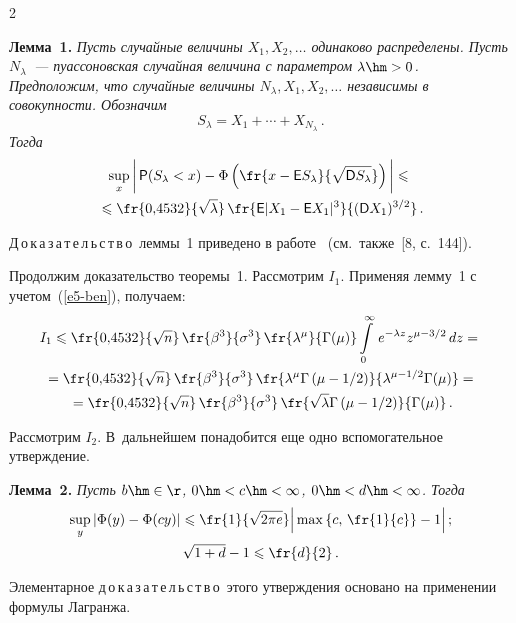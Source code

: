 \begin{multicols}{2}
\smallskip

\noindent
\textbf{Лемма~1.} \textit{Пусть случайные величины $X_1,X_2,\ldots$
одинаково распределены. Пусть $N_{\lambda}$~--- пуассоновская
случайная величина с параметром $\lambda\hm>0$. Предположим, что
случайные величины $N_{\lambda},X_1,X_2,\ldots$ независимы в
совокупности. Обозначим
$$
S_{\lambda}=X_1+\cdots+X_{N_{\lambda}}\,.
$$
Тогда}
\begin{multline*}
\sup\limits_x\bigg|\,{\sf P}(S_{\lambda}<x)-\Phi\left(\fr{x-{\sf
E}S_{\lambda}}{\sqrt{{\sf D}S_{\lambda}}}\right)\bigg|
\leqslant{}\\
{}\leqslant
\fr{0{,}4532}{\sqrt{\lambda}}\,
\fr{{\sf E}|X_1-{\sf E}X_1|^3}{({\sf D}X_1)^{3/2}}\,.
\end{multline*}

\smallskip

\noindent
Д\,о\,к\,а\,з\,а\,т\,е\,л\,ь\,с\,т\,в\,о\ леммы~1 приведено в 
работе~\cite{KorolevShevtsovaShorgin2011}
(см.\ также~[8, с.~144]).

\smallskip

Продолжим доказательство теоремы~1. Рас\-смот\-рим $I_1$. Применяя лемму~1 с учетом~(\ref{e5-ben}),
получаем:
\begin{multline}
I_1\leqslant\fr{0{,}4532}{\sqrt{n}}\,
\fr{\beta^3}{\sigma^3}\,
\fr{\lambda^{\mu}}{\Gamma(\mu)}\int\limits_{0}^{\infty}\,
e^{-\lambda z}z^{\mu-3/2}\,dz={}\\
{}=
\fr{0{,}4532}{\sqrt{n}}\,
\fr{\beta^3}{\sigma^3}\,
\fr{\lambda^{\mu}\Gamma\left(\mu-{1}/{2}\right)}{\lambda^{\mu-1/2}\Gamma(\mu)}={}\\
{}=
\fr{0{,}4532}{\sqrt{n}}\,\fr{\beta^3}{\sigma^3}\,
\fr{\sqrt{\lambda}\Gamma\left(\mu-{1}/{2}\right)}{\Gamma(\mu)}\,.
\label{e7-ben}
\end{multline}

Рассмотрим $I_2$. В~дальнейшем понадобится еще одно вспомогательное
утверждение.

\smallskip

\noindent
\textbf{Лемма~2.} \textit{Пусть $b\hm\in\r$, $0\hm<c\hm<\infty$, $0\hm<d\hm<\infty$.
Тогда}
\begin{gather}
\sup\limits_y|\Phi(y)-\Phi(cy)|\leqslant\fr{1}{\sqrt{2\pi e}}
\Big|\max\left\{c,\,\fr{1}{c}\right\}-1\Big|\,;\label{e8-ben}
\\
\sqrt{1+d}-1\leqslant\fr{d}{2}\,.\label{e9-ben}
\end{gather}

\smallskip

\noindent
Элементарное д\,о\,к\,а\,з\,а\,т\,е\,л\,ь\,с\,т\,в\,о\ этого утверждения основано
на применении формулы Лагранжа.


\end{multicols}
